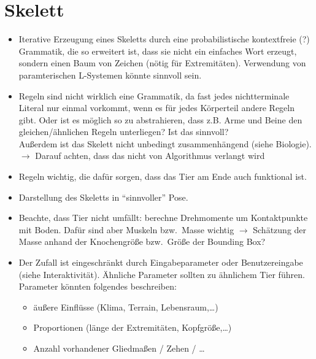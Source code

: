 \section{Skelett}

\begin{itemize}
 \item Iterative Erzeugung eines Skeletts durch eine probabilistische kontextfreie (?) Grammatik, die so erweitert ist, dass sie nicht ein einfaches Wort erzeugt, sondern einen Baum von Zeichen (nötig für Extremitäten). Verwendung von paramterischen L-Systemen \cite{Paramteric_L-Systems} könnte sinnvoll sein.
 \item Regeln sind nicht wirklich eine Grammatik, da fast jedes nichtterminale Literal nur einmal vorkommt, wenn es für jedes Körperteil andere Regeln gibt. Oder ist es möglich so zu abstrahieren, dass z.B. Arme und Beine den gleichen/ähnlichen Regeln unterliegen? Ist das sinnvoll? \\%
 Außerdem ist das Skelett nicht unbedingt zusammenhängend (siehe Biologie). $\rightarrow$ Darauf achten, dass das nicht von Algorithmus verlangt wird
 \item Regeln wichtig, die dafür sorgen, dass das Tier am Ende auch funktional ist.
 \item Darstellung des Skeletts in "`sinnvoller"' Pose.
 \item Beachte, dass Tier nicht umfällt: berechne Drehmomente um Kontaktpunkte mit Boden. Dafür sind aber Muskeln bzw.\ Masse wichtig $\rightarrow$ Schätzung der Masse anhand der Knochengröße bzw.\ Größe der Bounding Box?
 \item Der Zufall ist eingeschränkt durch Eingabeparameter oder Benutzereingabe (siehe Interaktivität). Ähnliche Parameter sollten zu ähnlichem Tier führen. Parameter könnten folgendes beschreiben:
 \begin{itemize}
  \item äußere Einflüsse (Klima, Terrain, Lebensraum,\dots)
  \item Proportionen (länge der Extremitäten, Kopfgröße,\dots)
  \item Anzahl vorhandener Gliedmaßen / Zehen / \dots
 \end{itemize}


\end{itemize}
